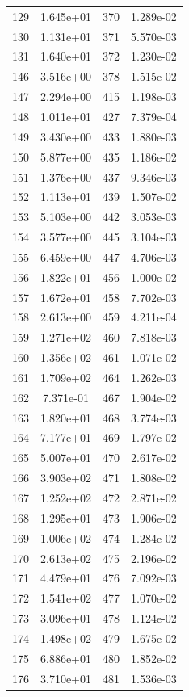 \documentclass[12pt]{article}
\begin{document}
\begin{longtable}{@{}cccc@{}}
129 & 1.645e+01 & 370 & 1.289e-02 \\
130 & 1.131e+01 & 371 & 5.570e-03 \\
131 & 1.640e+01 & 372 & 1.230e-02 \\
146 & 3.516e+00 & 378 & 1.515e-02 \\
147 & 2.294e+00 & 415 & 1.198e-03 \\
148 & 1.011e+01 & 427 & 7.379e-04 \\
149 & 3.430e+00 & 433 & 1.880e-03 \\
150 & 5.877e+00 & 435 & 1.186e-02 \\
151 & 1.376e+00 & 437 & 9.346e-03 \\
152 & 1.113e+01 & 439 & 1.507e-02 \\
153 & 5.103e+00 & 442 & 3.053e-03 \\
154 & 3.577e+00 & 445 & 3.104e-03 \\
155 & 6.459e+00 & 447 & 4.706e-03 \\
156 & 1.822e+01 & 456 & 1.000e-02 \\
157 & 1.672e+01 & 458 & 7.702e-03 \\
158 & 2.613e+00 & 459 & 4.211e-04 \\
159 & 1.271e+02 & 460 & 7.818e-03 \\
160 & 1.356e+02 & 461 & 1.071e-02 \\
161 & 1.709e+02 & 464 & 1.262e-03 \\
162 & 7.371e-01 & 467 & 1.904e-02 \\
163 & 1.820e+01 & 468 & 3.774e-03 \\
164 & 7.177e+01 & 469 & 1.797e-02 \\
165 & 5.007e+01 & 470 & 2.617e-02 \\
166 & 3.903e+02 & 471 & 1.808e-02 \\
167 & 1.252e+02 & 472 & 2.871e-02 \\
168 & 1.295e+01 & 473 & 1.906e-02 \\
169 & 1.006e+02 & 474 & 1.284e-02 \\
170 & 2.613e+02 & 475 & 2.196e-02 \\
171 & 4.479e+01 & 476 & 7.092e-03 \\
172 & 1.541e+02 & 477 & 1.070e-02 \\
173 & 3.096e+01 & 478 & 1.124e-02 \\
174 & 1.498e+02 & 479 & 1.675e-02 \\
175 & 6.886e+01 & 480 & 1.852e-02 \\
176 & 3.710e+01 & 481 & 1.536e-03 \\

\end{longtable}
\end{document}

